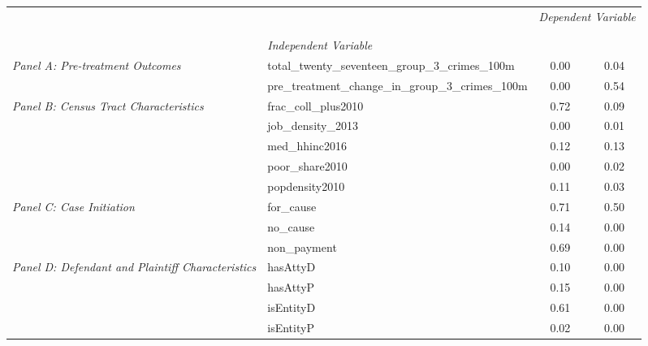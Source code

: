 \begin{tabular}{llcc}
\toprule
 &  & \multicolumn{2}{c}{\textit{Dependent Variable}} \\
\cline{3-4}
\\
 &  &  &  \\
 & \emph{Independent Variable} &  &  \\
\midrule
\multirow[c]{2}{3cm}{\textit{Panel A: Pre-treatment Outcomes}} & total_twenty_seventeen_group_3_crimes_100m & 0.00 & 0.04 \\
 & pre_treatment_change_in_group_3_crimes_100m & 0.00 & 0.54 \\
\cline{1-4}
\multirow[c]{5}{3cm}{\textit{Panel B: Census Tract Characteristics}} & frac_coll_plus2010 & 0.72 & 0.09 \\
 & job_density_2013 & 0.00 & 0.01 \\
 & med_hhinc2016 & 0.12 & 0.13 \\
 & poor_share2010 & 0.00 & 0.02 \\
 & popdensity2010 & 0.11 & 0.03 \\
\cline{1-4}
\multirow[c]{3}{3cm}{\textit{Panel C: Case Initiation}} & for_cause & 0.71 & 0.50 \\
 & no_cause & 0.14 & 0.00 \\
 & non_payment & 0.69 & 0.00 \\
\cline{1-4}
\multirow[c]{4}{3cm}{\textit{Panel D: Defendant and Plaintiff Characteristics}} & hasAttyD & 0.10 & 0.00 \\
 & hasAttyP & 0.15 & 0.00 \\
 & isEntityD & 0.61 & 0.00 \\
 & isEntityP & 0.02 & 0.00 \\
\cline{1-4}
\bottomrule
\end{tabular}

